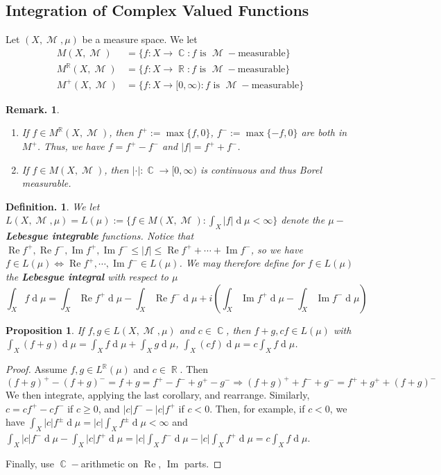 \documentclass[12pt, a4paper]{memoir}
\DeclareMathOperator{\R}{{\mathbb{R}}}
\DeclareMathOperator{\C}{{\mathbb{C}}}
\newtheorem{proposition}[theorem]{Proposition}
\theoremstyle{nonumberplain}
\newtheorem{definition}{Definition.}
\newtheorem{remark}{Remark.}
\newtheorem{proof}{Proof}
\DeclareMathOperator{\M}{\mathcal{M}}
\renewcommand{\Re}{\ensuremath{\operatorname{Re}}}
\renewcommand{\Im}{\ensuremath{\operatorname{Im}}}
\renewcommand{\d}[1]{\ensuremath{\operatorname{d}\!{#1}}} %
\begin{document}
\subsection{Integration of Complex Valued Functions}
Let $(X,\M,\mu)$ be a measure space.
We let
\begin{align*}
    M(X,\M)&=\{f:X\to\C:f\text{ is $\M-$measurable}\}\\
    M^{\R}(X,\M)&=\{f:X\to\R:f\text{ is $\M-$measurable}\}\\
    M^+(X,\M)&=\{f:X\to[0,\infty):f\text{ is $\M-$measurable}\}
\end{align*}
\begin{remark}
    \begin{enumerate}
        \item If $f\in M^{\R}(X,\M)$, then $f^+:=\max\{f,0\}$, $f^-:=\max\{-f,0\}$ are both in $M^+$.
            Thus, we have $f=f^+-f^-$ and $|f|=f^++f^-$.
        \item If $f\in M(X,\M)$, then $|\cdot|:\C\to[0,\infty)$ is continuous and thus Borel measurable. %
    \end{enumerate}
\end{remark}
\begin{definition}
    We let $L(X,\M,\mu)=L(\mu):=\{f\in M(X,\M):\int_X|f|\d{\mu}<\infty\}$ denote the \textbf{$\mu-$Lebesgue integrable} functions.
    Notice that $\Re f^+,\Re f^-,\Im f^+,\Im f^-\leq |f|\leq\Re f^++\cdots+\Im f^-$, so we have $f\in L(\mu)\Leftrightarrow \Re f^+,\cdots,\Im f^-\in L(\mu)$.
    We may therefore define for $f\in L(\mu)$ the \textbf{Lebesgue integral} with respect to $\mu$
    \begin{equation*}
        \int_X f\d{\mu}=\int_X\Re f^+\d{\mu}-\int_X\Re f^-\d{\mu}+i\left(\int_X\Im f^+\d{\mu}-\int_X\Im f^-\d{\mu}\right)
    \end{equation*}
\end{definition}
\begin{proposition}
    If $f,g\in L(X,\M,\mu)$ and $c\in\C$, then $f+g,cf\in L(\mu)$ with $\int_X(f+g)\d{\mu}=\int_X f\d{\mu}+\int_X g\d{\mu}$, $\int_X(cf)\d{\mu}=c\int_X f\d{\mu}$.
\end{proposition}
\begin{proof}
    Assume $f,g\in L^{\R}(\mu)$ and $c\in\R$.
    Then
    \begin{equation*}
        (f+g)^+-(f+g)^-=f+g=f^+-f^-+g^+-g^-\Rightarrow(f+g)^++f^-+g^-=f^++g^++(f+g)^-
    \end{equation*}
    We then integrate, applying the last corollary, and rearrange.
    Similarly, $c=cf^+-cf^-$ if $c\geq 0$, and $|c|f^--|c|f^+$ if $c<0$.
    Then, for example, if $c<0$, we have $\int_X|c|f^\pm\d{\mu}=|c|\int_Xf^{\pm}\d{\mu}<\infty$ and $\int_X|c|f^-\d{\mu}-\int_X|c|f^+\d{\mu}=|c|\int_X f^-\d{\mu}-|c|\int_X f^+\d{\mu}=c\int_Xf\d{\mu}$.

    Finally, use $\C-$arithmetic on $\Re$, $\Im$ parts.
\end{proof}
\end{document}
